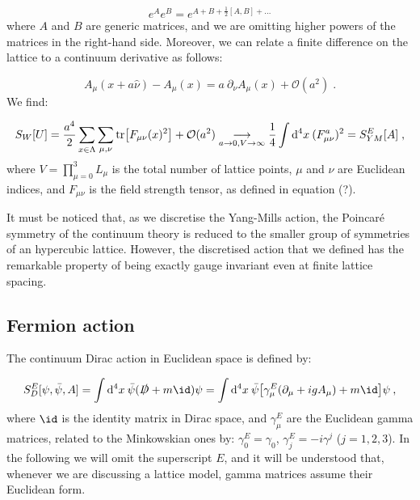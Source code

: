 \begin{equation}
e^A e^B = e^{A+B+\frac{1}{2}[A,B] + \dots}
\end{equation}
%
where $A$  and $B$ are generic matrices, and we are omitting higher powers of the matrices in the right-hand side. Moreover, we can relate a finite difference on the lattice to a continuum derivative as follows:

\begin{equation}
A_{\mu}(x + a \hat \nu) - A_{\mu}(x) = a \: \partial_{\nu} A_{\mu}(x) + \mathcal{O}(a^2) \; .
\end{equation}
%
We find:

\begin{equation}
S_W[U] = \frac{a^4}{2} \sum_{x \in \Lambda} \sum_{\mu, \nu} \tr [F_{\mu \nu}(x)^2]  + \mathcal O(a^2) \underset{a \to 0, V \to \infty}{\longrightarrow} \frac{1}{4} \int \mathrm{d}^4x \: (F_{\mu \nu}^a)^2 = S_{YM}^E[A]\; ,
\end{equation}
%
where $V = \prod_{\mu = 0}^3L_{\mu}$ is the total number of lattice points, $\mu$ and $\nu$ are Euclidean indices, and $F_{\mu \nu}$ is the field strength tensor, as defined in equation (?).

It must be noticed that, as we discretise the Yang-Mills action, the Poincaré symmetry of the continuum theory is reduced to the smaller group of symmetries of an hypercubic lattice. However, the discretised action that we defined has the remarkable property of being exactly gauge invariant even at finite lattice spacing.



\subsection{Fermion action}
\label{fermion_action}

The continuum Dirac action in Euclidean space is defined by:

\begin{equation}
S_D^E[\psi, \bar \psi, A] = \int \dx  \: \bar \psi (\slashed D + m \id) \psi = \int \dx \: \bar \psi \bigl[ \gamma_{\mu}^E(\partial_{\mu} + i g A_{\mu}) + m \id \bigr] \psi \: ,
\end{equation}
%
where $\id$ is the identity matrix in Dirac space, and $\gamma_{\mu}^E$ are the Euclidean gamma matrices, related to the Minkowskian ones by: $\gamma_0^E = \gamma_0$, $\gamma_j^E = - i \gamma^j$ ($j = 1,2,3$). In the following we will omit the superscript $E$, and it will be understood that, whenever we are discussing a lattice model, gamma matrices assume their Euclidean form.

